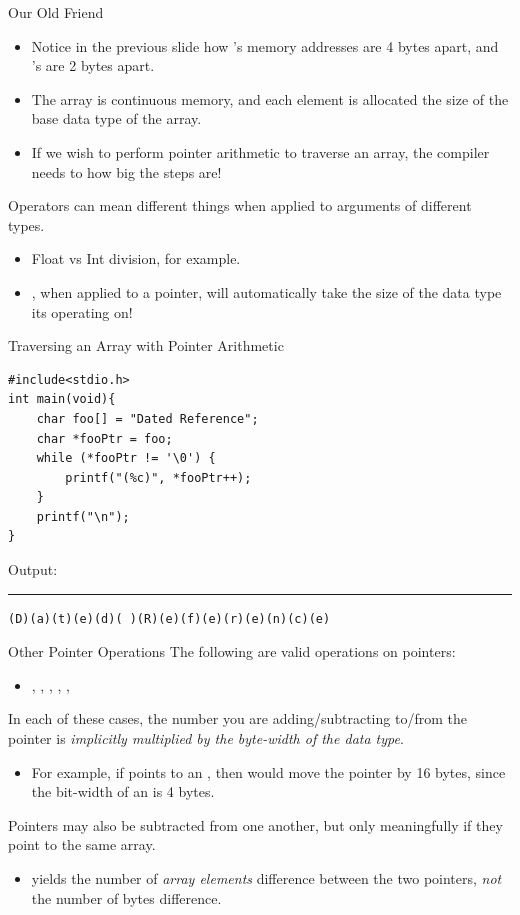 \documentclass[11pt]{beamer}
\let\OldTexttt\texttt
\renewcommand{\texttt}[1]{\OldTexttt{\color{teal}{#1}}}
\begin{document}
\begin{frame}{Our Old Friend \texttt{++}}
\begin{itemize}
\item Notice in the previous slide how \texttt{foo}'s memory addresses are 4 bytes apart, and \texttt{bar}'s are 2 bytes apart.
\item The array is continuous memory, and each element is allocated the size of the base data type of the array.
\item If we wish to perform pointer arithmetic to traverse an array, the compiler needs to how big the steps are!
\end{itemize}
Operators can mean different things when applied to arguments of different types.
\begin{itemize}
\item Float vs Int division, for example.
\item \texttt{++}, when applied to a pointer, will automatically take the size of the data type its operating on! 
\end{itemize}
\end{frame}

\begin{frame}[fragile=singleslide]{Traversing an Array with Pointer Arithmetic}
\begin{lstlisting}[style=C]
#include<stdio.h>
int main(void){
	char foo[] = "Dated Reference";
	char *fooPtr = foo;
	while (*fooPtr != '\0') {
		printf("(%c)", *fooPtr++);
	} 
	printf("\n");
}
\end{lstlisting}
Output:
\hrule
\begin{verbatim}
(D)(a)(t)(e)(d)( )(R)(e)(f)(e)(r)(e)(n)(c)(e)
\end{verbatim}
\end{frame}

\begin{frame}{Other Pointer Operations}
The following are valid operations on pointers:
\begin{itemize}
\item \texttt{++}, \texttt{--}, \texttt{+}, \texttt{-}, \texttt{+=}, \texttt{-=}
\end{itemize}
In each of these cases, the number you are adding/subtracting to/from the pointer is \emph{implicitly multiplied by the byte-width of the data type}.
\begin{itemize}
\item For example, if \texttt{ptr} points to an \texttt{int}, then \texttt{ptr += 4} would move the pointer by 16 bytes, since the bit-width of an \texttt{int} is 4 bytes.
\end{itemize}
Pointers may also be subtracted from one another, but only meaningfully if they point to the same array.
\begin{itemize}
\item \texttt{ptrA - ptrB} yields the number of \emph{array elements} difference between the two pointers, \emph{not} the number of bytes difference.
\end{itemize}
\end{frame}
\end{document}
